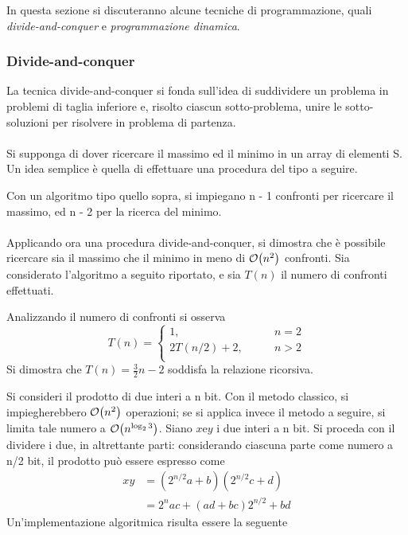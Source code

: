 \documentclass{subfiles}
\begin{document}
In questa sezione si discuteranno alcune tecniche di programmazione, quali \emph{divide-and-conquer} e \emph{programmazione dinamica}.

\subsubsection{Divide-and-conquer}
La tecnica divide-and-conquer si fonda sull'idea di suddividere un problema in problemi di taglia inferiore e, risolto ciascun sotto-problema,
unire le sotto-soluzioni per risolvere in problema di partenza.
\\ \\
Si supponga di dover ricercare il massimo ed il minimo in un array di elementi S. Un idea semplice è quella di effettuare una procedura del tipo a seguire.


\noindent Con un algoritmo tipo quello sopra, si impiegano n - 1 confronti per ricercare il massimo, ed n - 2 per la ricerca del minimo.
\\ \\
Applicando ora una procedura divide-and-conquer, si dimostra che è possibile ricercare sia il massimo che il minimo in meno di \(\order{n^{2}}\) confronti.
Sia considerato l'algoritmo a seguito riportato, e sia \(T(n)\) il numero di confronti effettuati.


\noindent Analizzando il numero di confronti si osserva
\[
    T(n) = \begin{cases}
        1, \qquad           & n = 2 \\
        2T(n/2) + 2, \qquad & n > 2 \\
    \end{cases}
\]
\noindent Si dimostra che \(T(n) = \tfrac{3}{2} n - 2\) soddisfa la relazione ricorsiva.
\clearpage

\noindent Si consideri il prodotto di due interi a n bit. Con il metodo classico, si impiegherebbero \(\order{n^{2}}\) operazioni;
se si applica invece il metodo a seguire, si limita tale numero a \(\order{n^{\log_{2}{3}}}\).
Siano \(x \text{e} y\) i due interi a n bit. Si proceda con il dividere i due, in altrettante parti:
considerando ciascuna parte come numero a n/2 bit, il prodotto può essere espresso come
\[
    \begin{aligned}
        xy & = (2^{n/2}a + b)(2^{n/2}c + d)     \\
           & =  2^{n}ac + (ad + bc)2^{n/2} + bd
    \end{aligned}
\]
\noindent Un'implementazione algoritmica risulta essere la seguente

\end{document}
